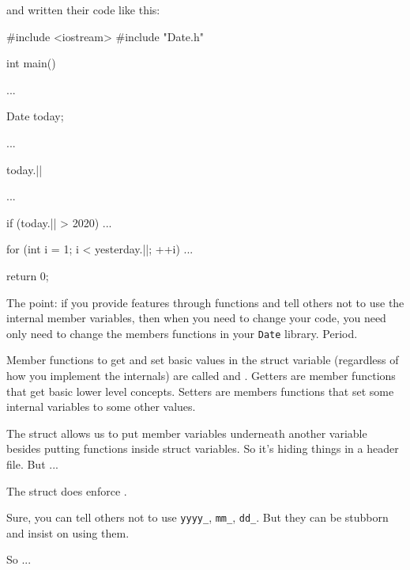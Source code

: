and written their code like this:

\begin{consolethree}[escapeinside=||]
#include <iostream>
#include "Date.h"

int main()
{
    ...

    Date today;

    ...

    today.||

    ...

    if (today.|| > 2020)
    {
        ...
    }

    for (int i = 1; i < yesterday.||; ++i)
    {
        ...
    }

    return 0;
}
\end{consolethree}
The point: if you provide features through functions and tell others not
to use the internal member variables, then when you need to change your
code, you need only need to change the members functions in your
\texttt{Date} library. Period.



Member functions to get and set basic values in the struct variable
(regardless of how you implement the internals) are called
 and . Getters are member functions that
get basic lower level concepts. Setters are members functions that set
some internal variables to some other values.

The struct allows us to put member variables underneath another variable
besides putting functions inside struct variables. So
it's hiding things in a header file. But ...

The struct does  enforce .

Sure, you can tell others not to use \texttt{yyyy\_}, \texttt{mm\_},
\texttt{dd\_}. But they can be stubborn and insist on using them.

So ...


